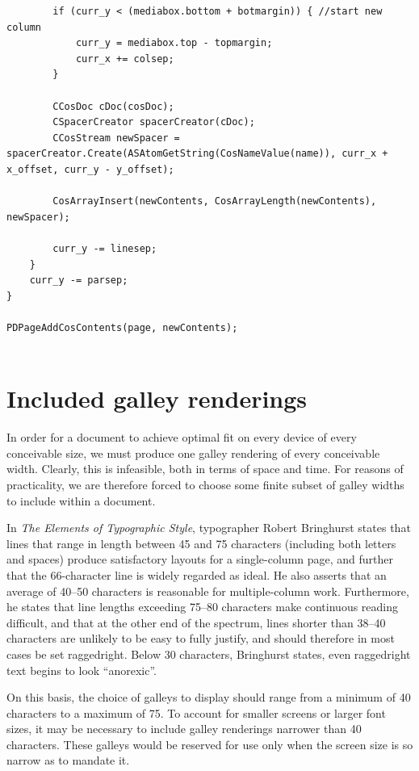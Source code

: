 \begin{lstlisting}
        if (curr_y < (mediabox.bottom + botmargin)) { //start new column
            curr_y = mediabox.top - topmargin;
            curr_x += colsep;
        }
        
        CCosDoc cDoc(cosDoc);
        CSpacerCreator spacerCreator(cDoc);
        CCosStream newSpacer = spacerCreator.Create(ASAtomGetString(CosNameValue(name)), curr_x + x_offset, curr_y - y_offset);
        
        CosArrayInsert(newContents, CosArrayLength(newContents), newSpacer);
        
        curr_y -= linesep;
    }
    curr_y -= parsep;
}

PDPageAddCosContents(page, newContents);


\end{lstlisting}


\section{Included galley renderings}
\label{sec:inc-renderings}
In order for a document to achieve optimal fit on every device of every conceivable size, we must produce one galley rendering of every conceivable width. Clearly, this is infeasible, both in terms of space and time. For reasons of practicality, we are therefore forced to choose some finite subset of galley widths to include within a document.

In \emph{The Elements of Typographic Style},\cite{Bringhurst2008} typographer Robert Bringhurst states that lines that range in length between 45 and 75 characters (including both letters and spaces) produce satisfactory layouts for a single-column page, and further that the 66-character line is widely regarded as ideal. He also asserts that an average of \mbox{40--50} characters is reasonable for multiple-column work. Furthermore, he states that line lengths exceeding 75--80 characters make continuous reading difficult, and that at the other end of the spectrum, lines shorter than 38--40 characters are unlikely to be easy to fully justify, and should therefore in most cases be set \gls{raggedright}. Below 30 characters, Bringhurst states, even \gls{raggedright} text begins to look ``anorexic''.

On this basis, the choice of galleys to display should range from a minimum of 40 characters to a maximum of 75. To account for smaller screens or larger font sizes, it may be necessary to include galley renderings narrower than 40 characters. These galleys would be reserved for use only when the screen size is so narrow as to mandate it.

